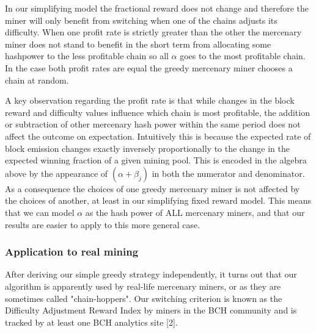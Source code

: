 \documentclass[10pt, preprint]{aastex}
\begin{document}
In our simplifying model the fractional reward does not change and therefore the miner will only benefit from switching when one of the chains adjusts its difficulty.  When one profit rate is strictly greater than the other the mercenary miner does not stand to benefit in the short term from allocating some hashpower to the less profitable chain so all $\alpha$ goes to the most profitable chain.  In the case both profit rates are equal the greedy mercenary miner chooses a chain at random. 

A key observation regarding the profit rate is that while changes in the block reward and difficulty values influence which chain is most profitable, the addition or subtraction of other mercenary hash power within the same period does not affect the outcome on expectation.  Intuitively this is because the expected rate of block emission changes exactly inversely proportionally to the change in the expected winning fraction of a given mining pool.  This is encoded in the algebra above by the appearance of $(\alpha + \beta_j)$ in both the numerator and denominator.  As a consequence the choices of one greedy mercenary miner is not affected by the choices of another, at least in our simplifying fixed reward model.  This means that we can model $\alpha$ as the hash power of ALL mercenary miners, and that our results are easier to apply to this more general case.

\subsubsection{Application to real mining}
After deriving our simple greedy strategy independently, it turns out that our algorithm is apparently used by real-life mercenary miners, or as they are sometimes called "chain-hoppers".  Our switching criterion is known as the Difficulty Adjustment Reward Index by miners in the BCH community and is tracked by at least one BCH analytics site [2].
\end{document}
